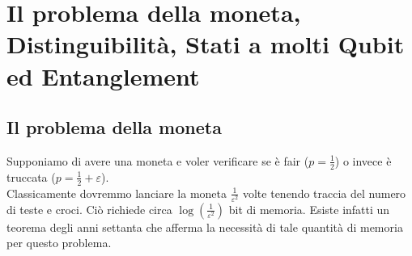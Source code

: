 \documentclass{article}
\begin{document}
    \section{Il problema della moneta, Distinguibilità, Stati a molti Qubit ed Entanglement}
    \subsection{Il problema della moneta}
    Supponiamo di avere una moneta e voler verificare se è fair ($p = \frac{1}{2}$) o invece è truccata ($p = \frac{1}{2}+ \varepsilon$). 
    \\
    Classicamente dovremmo lanciare la moneta $\frac{1}{\varepsilon^2}$ volte tenendo traccia del numero di teste e croci. Ciò richiede circa $\log\left(\frac{1}{\varepsilon^2}\right)$ bit di memoria. Esiste infatti un teorema degli anni settanta che afferma la necessità di tale quantità di memoria per questo problema. 
    
\end{document}
